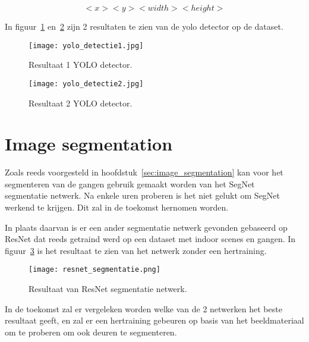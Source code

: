    \begin{equation} \label{eq:yolo}
      <x> <y> <width> <height> 
   \end{equation}

   In figuur~\ref{fig:yolo_1} en~\ref{fig:yolo_2} zijn 2 resultaten te zien van de \gls{yolo} detector op de dataset.

   \begin{figure}[H]
      \centering
      \texttt{[image: yolo\_detectie1.jpg]}
      \caption{Resultaat 1 YOLO detector.}
      \label{fig:yolo_1}
   \end{figure}

   \begin{figure}[!htb]
      \centering
      \texttt{[image: yolo\_detectie2.jpg]}
      \caption{Resultaat 2 YOLO detector.}
      \label{fig:yolo_2}
   \end{figure}

\newpage
\section{Image segmentation}

   Zoals reeds voorgesteld in hoofdstuk~\ref{sec:image_segmentation} kan voor het segmenteren van de gangen gebruik gemaakt worden van het SegNet~\cite{Badrinarayanan} segmentatie netwerk.
   Na enkele uren proberen is het niet gelukt om SegNet werkend te krijgen. Dit zal in de toekomst hernomen worden.

   In plaats daarvan is er een ander segmentatie netwerk gevonden gebaseerd op ResNet dat reeds getraind werd op een dataset met indoor scenes en gangen.
   In figuur~\ref{fig:resnet_seg} is het resultaat te zien van het netwerk zonder een hertraining.

   
   \begin{figure}[!htb]
      \centering
      \texttt{[image: resnet\_segmentatie.png]}
      \caption{Resultaat van ResNet segmentatie netwerk.}
      \label{fig:resnet_seg}
   \end{figure}

   In de toekomst zal er vergeleken worden welke van de 2 netwerken het beste resultaat geeft, en zal er een hertraining gebeuren op basis van het beeldmateriaal om te proberen om ook deuren te segmenteren.